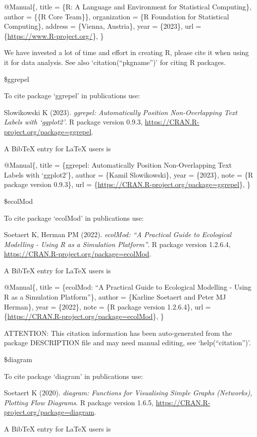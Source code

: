 \documentclass[
]{article}
\begin{document}
@Manual\{, title = \{R: A Language and Environment for Statistical
Computing\}, author = \{\{R Core Team\}\}, organization = \{R Foundation
for Statistical Computing\}, address = \{Vienna, Austria\}, year =
\{2023\}, url = \{\url{https://www.R-project.org/}\}, \}

We have invested a lot of time and effort in creating R, please cite it
when using it for data analysis. See also `citation(``pkgname'')' for
citing R packages.

\$ggrepel

To cite package `ggrepel' in publications use:

Slowikowski K (2023). \emph{ggrepel: Automatically Position
Non-Overlapping Text Labels with `ggplot2'}. R package version 0.9.3,
\url{https://CRAN.R-project.org/package=ggrepel}.

A BibTeX entry for LaTeX users is

@Manual\{, title = \{ggrepel: Automatically Position Non-Overlapping
Text Labels with `ggplot2'\}, author = \{Kamil Slowikowski\}, year =
\{2023\}, note = \{R package version 0.9.3\}, url =
\{\url{https://CRAN.R-project.org/package=ggrepel}\}, \}

\$ecolMod

To cite package `ecolMod' in publications use:

Soetaert K, Herman PM (2022). \emph{ecolMod: ``A Practical Guide to
Ecological Modelling - Using R as a Simulation Platform''}. R package
version 1.2.6.4, \url{https://CRAN.R-project.org/package=ecolMod}.

A BibTeX entry for LaTeX users is

@Manual\{, title = \{ecolMod: ``A Practical Guide to Ecological
Modelling - Using R as a Simulation Platform''\}, author = \{Karline
Soetaert and Peter MJ Herman\}, year = \{2022\}, note = \{R package
version 1.2.6.4\}, url =
\{\url{https://CRAN.R-project.org/package=ecolMod}\}, \}

ATTENTION: This citation information has been auto-generated from the
package DESCRIPTION file and may need manual editing, see
`help(``citation'')'.

\$diagram

To cite package `diagram' in publications use:

Soetaert K (2020). \emph{diagram: Functions for Visualising Simple
Graphs (Networks), Plotting Flow Diagrams}. R package version 1.6.5,
\url{https://CRAN.R-project.org/package=diagram}.

A BibTeX entry for LaTeX users is
\end{document}
